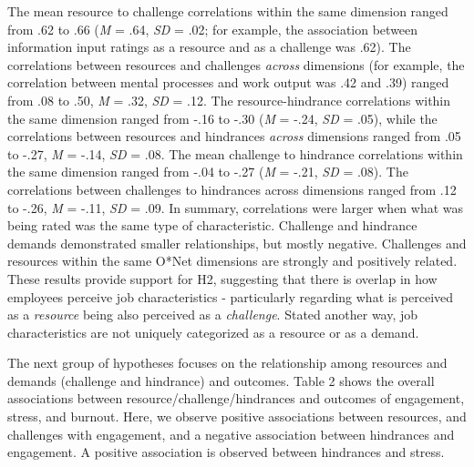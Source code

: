 \documentclass[
  man]{apa7}
\begin{document}
The mean resource to challenge correlations within the same dimension ranged from .62 to .66 (\emph{M} = .64, \emph{SD} = .02; for example, the association between information input ratings as a resource and as a challenge was .62). The correlations between resources and challenges \emph{across} dimensions (for example, the correlation between mental processes and work output was .42 and .39) ranged from .08 to .50, \emph{M} = .32, \emph{SD} = .12. The resource-hindrance correlations within the same dimension ranged from -.16 to -.30 (\emph{M} = -.24, \emph{SD} = .05), while the correlations between resources and hindrances \emph{across} dimensions ranged from .05 to -.27, \emph{M} = -.14, \emph{SD} = .08. The mean challenge to hindrance correlations within the same dimension ranged from -.04 to -.27 (\emph{M} = -.21, \emph{SD} = .08). The correlations between challenges to hindrances across dimensions ranged from .12 to -.26, \emph{M} = -.11, \emph{SD} = .09. In summary, correlations were larger when what was being rated was the same type of characteristic. Challenge and hindrance demands demonstrated smaller relationships, but mostly negative. Challenges and resources within the same O*Net dimensions are strongly and positively related. These results provide support for H2, suggesting that there is overlap in how employees perceive job characteristics - particularly regarding what is perceived as a \emph{resource} being also perceived as a \emph{challenge}. Stated another way, job characteristics are not uniquely categorized as a resource or as a demand.

The next group of hypotheses focuses on the relationship among resources and demands (challenge and hindrance) and outcomes. Table 2 shows the overall associations between resource/challenge/hindrances and outcomes of engagement, stress, and burnout. Here, we observe positive associations between resources, and challenges with engagement, and a negative association between hindrances and engagement. A positive association is observed between hindrances and stress.
\end{document}
